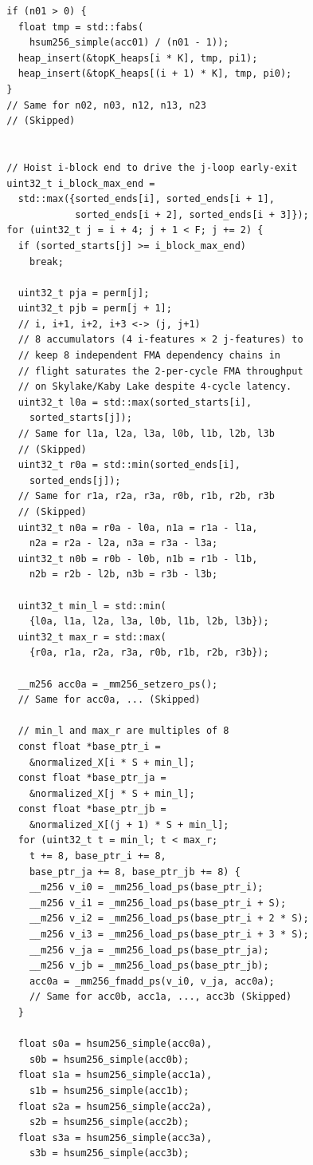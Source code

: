 \documentclass[letterpaper]{article}
\begin{document}
{\begin{Verbatim}
  if (n01 > 0) {
    float tmp = std::fabs(
      hsum256_simple(acc01) / (n01 - 1));
    heap_insert(&topK_heaps[i * K], tmp, pi1);
    heap_insert(&topK_heaps[(i + 1) * K], tmp, pi0);
  }
  // Same for n02, n03, n12, n13, n23
  // (Skipped)


  // Hoist i-block end to drive the j-loop early-exit
  uint32_t i_block_max_end =
    std::max({sorted_ends[i], sorted_ends[i + 1], 
              sorted_ends[i + 2], sorted_ends[i + 3]});
  for (uint32_t j = i + 4; j + 1 < F; j += 2) {
    if (sorted_starts[j] >= i_block_max_end)
      break;
          
    uint32_t pja = perm[j];
    uint32_t pjb = perm[j + 1];
    // i, i+1, i+2, i+3 <-> (j, j+1)
    // 8 accumulators (4 i-features × 2 j-features) to 
    // keep 8 independent FMA dependency chains in 
    // flight saturates the 2-per-cycle FMA throughput  
    // on Skylake/Kaby Lake despite 4-cycle latency.
    uint32_t l0a = std::max(sorted_starts[i], 
      sorted_starts[j]);
    // Same for l1a, l2a, l3a, l0b, l1b, l2b, l3b 
    // (Skipped)
    uint32_t r0a = std::min(sorted_ends[i], 
      sorted_ends[j]);
    // Same for r1a, r2a, r3a, r0b, r1b, r2b, r3b 
    // (Skipped)
    uint32_t n0a = r0a - l0a, n1a = r1a - l1a, 
      n2a = r2a - l2a, n3a = r3a - l3a;
    uint32_t n0b = r0b - l0b, n1b = r1b - l1b, 
      n2b = r2b - l2b, n3b = r3b - l3b;

    uint32_t min_l = std::min(
      {l0a, l1a, l2a, l3a, l0b, l1b, l2b, l3b});
    uint32_t max_r = std::max(
      {r0a, r1a, r2a, r3a, r0b, r1b, r2b, r3b});

    __m256 acc0a = _mm256_setzero_ps();
    // Same for acc0a, ... (Skipped)
    
    // min_l and max_r are multiples of 8
    const float *base_ptr_i = 
      &normalized_X[i * S + min_l];
    const float *base_ptr_ja = 
      &normalized_X[j * S + min_l];
    const float *base_ptr_jb = 
      &normalized_X[(j + 1) * S + min_l];
    for (uint32_t t = min_l; t < max_r;
      t += 8, base_ptr_i += 8, 
      base_ptr_ja += 8, base_ptr_jb += 8) {
      __m256 v_i0 = _mm256_load_ps(base_ptr_i);
      __m256 v_i1 = _mm256_load_ps(base_ptr_i + S);
      __m256 v_i2 = _mm256_load_ps(base_ptr_i + 2 * S);
      __m256 v_i3 = _mm256_load_ps(base_ptr_i + 3 * S);
      __m256 v_ja = _mm256_load_ps(base_ptr_ja);
      __m256 v_jb = _mm256_load_ps(base_ptr_jb);
      acc0a = _mm256_fmadd_ps(v_i0, v_ja, acc0a);
      // Same for acc0b, acc1a, ..., acc3b (Skipped)
    }

    float s0a = hsum256_simple(acc0a), 
      s0b = hsum256_simple(acc0b);
    float s1a = hsum256_simple(acc1a), 
      s1b = hsum256_simple(acc1b);
    float s2a = hsum256_simple(acc2a), 
      s2b = hsum256_simple(acc2b);
    float s3a = hsum256_simple(acc3a), 
      s3b = hsum256_simple(acc3b);


\end{Verbatim}}
\end{document}
